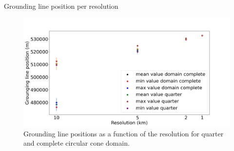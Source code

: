 \documentclass[11pt]{beamer}
\begin{document}
	\begin{frame}{Grounding line position per resolution}
		\begin{figure}
			\centering
			\includegraphics[width=0.8\linewidth]{../fig/Figure_CONE_GL_positions.png}
			\caption{Grounding line positions as a function of the resolution for quarter and complete circular cone domain.}
			\label{Grounding_lines__CONE_comparison}
		\end{figure}
	
	\end{frame}
\end{document}
